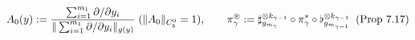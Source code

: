 \documentclass[preview]{standalone}
\begin{document}
\begin{align*}
\special{dvisvgm:raw <g id='unique000'>}A_0(y) := \frac{\sum_{i=1}^{m_1}\partial/\partial y_i}{\|\sum_{i=1}^{m_1}\partial/\partial y_i\|_{g(y)}}\;(\|A_0\|_{C_b^0}=1), \qquad \pi_\gamma^\circledast := \sharp_{g_{m_\gamma}}^{\otimes k_{\gamma-1}}\circ\pi_\gamma^*\circ\flat_{g_{m_{\gamma-1}}}^{\otimes k_{\gamma-1}}\;\;(\text{Prop 7.17})\special{dvisvgm:raw </g>}
\end{align*}
\end{document}
